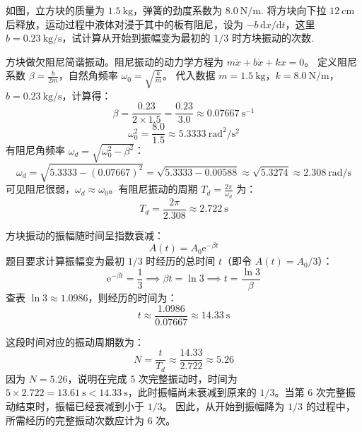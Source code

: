 \begin{exercise}\label{ex:7.7}
如图，立方块的质量为 $1.5 \ \mathrm{kg}$，弹簧的劲度系数为 $8.0 \ \mathrm{N/m}$. 将方块向下拉 $12 \ \mathrm{cm}$ 后释放，运动过程中液体对浸于其中的板有阻尼，设为 $-b \, \mathrm{d}x/\mathrm{d}t$，这里 $b = 0.23 \ \mathrm{kg/s}$，试计算从开始到振幅变为最初的 $1/3$ 时方块振动的次数.
\begin{center}
\end{center}
\end{exercise}
\begin{solution}
方块做欠阻尼简谐振动。阻尼振动的动力学方程为 $m \ddot{x} + b \dot{x} + k x = 0$。
定义阻尼系数 $\beta = \frac{b}{2m}$，自然角频率 $\omega_0 = \sqrt{\frac{k}{m}}$。
代入数据 $m = 1.5 \ \mathrm{kg}$，$k = 8.0 \ \mathrm{N/m}$，$b = 0.23 \ \mathrm{kg/s}$，计算得：
$$ \beta = \frac{0.23}{2 \times 1.5} = \frac{0.23}{3.0} \approx 0.07667 \ \mathrm{s^{-1}} $$
$$ \omega_0^2 = \frac{8.0}{1.5} \approx 5.3333 \ \mathrm{rad^2/s^2} $$
有阻尼角频率 $\omega_d = \sqrt{\omega_0^2 - \beta^2}$：
$$ \omega_d = \sqrt{5.3333 - (0.07667)^2} = \sqrt{5.3333 - 0.00588} \approx \sqrt{5.3274} \approx 2.308 \ \mathrm{rad/s} $$
可见阻尼很弱，$\omega_d \approx \omega_0$。有阻尼振动的周期 $T_d = \frac{2\pi}{\omega_d}$ 为：
$$ T_d = \frac{2\pi}{2.308} \approx 2.722 \ \mathrm{s} $$

方块振动的振幅随时间呈指数衰减：
$$ A(t) = A_0 \mathrm{e}^{-\beta t} $$
题目要求计算振幅变为最初 $1/3$ 时经历的总时间 $t$（即令 $A(t) = A_0 / 3$）：
$$ \mathrm{e}^{-\beta t} = \frac{1}{3} \implies \beta t = \ln 3 \implies t = \frac{\ln 3}{\beta} $$
查表 $\ln 3 \approx 1.0986$，则经历的时间为：
$$ t \approx \frac{1.0986}{0.07667} \approx 14.33 \ \mathrm{s} $$

这段时间对应的振动周期数为：
$$ N = \frac{t}{T_d} \approx \frac{14.33}{2.722} \approx 5.26 $$
因为 $N = 5.26$，说明在完成 5 次完整振动时，时间为 $5 \times 2.722 = 13.61 \ \mathrm{s} < 14.33 \ \mathrm{s}$，此时振幅尚未衰减到原来的 $1/3$。当第 6 次完整振动结束时，振幅已经衰减到小于 $1/3$。
因此，从开始到振幅降为 $1/3$ 的过程中，所需经历的完整振动次数应计为 $6$ 次。
\end{solution}

